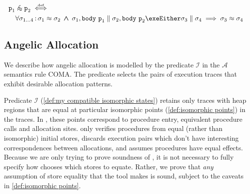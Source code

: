 \documentclass[runningheads,a4paper]{llncs}
\DeclareMathOperator{\band}{\bm{\;\land\;}}
\DeclareMathOperator{\suchthat}{:}
\newcommand*{\qvars}[2]{#1_{#2}}
\newcommand*{\defiff}{\stackrel{\text{\tiny def}}{\iff}}
\newcommand*{\sima}[1]{%
  \mathrel{\vcenter{\offinterlineskip
  \hbox{$\scriptscriptstyle\,\mathcal{#1}$}\vskip-.00ex\hbox{$\sim$}\vskip-.35ex\hbox{$\sim$}}}}
\newcommand*\iso{\approx}
\newcommand*\isol{\sima{L}}
\newcommand*{\parcomp}{\parallel}
\newcommand*\Asemantics{\mathcal{A}}
\newcommand*\asemantics{$\Asemantics$ semantics}
\newcommand*{\composeRuleAbstract}{\textnormal{COMA}}
\newcommand*{\body}{\mathtt{body}}
\newcommand*{\fun}{\texttt{p}}
\newcommand*{\isoR}{\mathcal{I}}
\newcommand*{\store}{\sigma}
\begin{document}
\begin{definition}\label{def:procedure equivalence}\setlength{\parindent}{0cm}
\[\begin{aligned}
&\fun_1 \isol \fun_2 \defiff \\
&\quad\forall \qvars{\store}{1 \ldots 4} \suchthat
	\store_1 \iso \store_2 \band
        \store_1,\body~\fun_1 \parcomp \store_2,\body~\fun_2 \exeEither \store_3 \parcomp \store_4
	\implies
	\store_3 \iso \store_4
\end{aligned}\]
\end{definition}

\subsection{Angelic Allocation}

We describe how angelic allocation is modelled by the predicate $\isoR$ in the \asemantics{} rule \composeRuleAbstract{}. The predicate selects the pairs of execution traces that exhibit desirable allocation patterns.

Predicate $\isoR$ (\cref{def:my compatible isomorphic states}) retains only traces with heap regions that are equal at particular isomorphic points (\cref{def:isomorphic points}) in the traces. In \tool{}, these points correspond to procedure entry, equivalent procedure calls and allocation sites. \tool{} only verifies procedures from equal (rather than isomorphic) initial stores, discards execution pairs which don't have interesting correspondences between allocations, and assumes procedures have equal effects. Because we are only trying to prove soundness of \metho{}, it is not necessary to fully specify how \tool{} chooses which stores to equate. Rather, we prove that \emph{any} assumption of store equality that the tool makes is sound, subject to the caveats in \cref{def:isomorphic points}.
\end{document}
